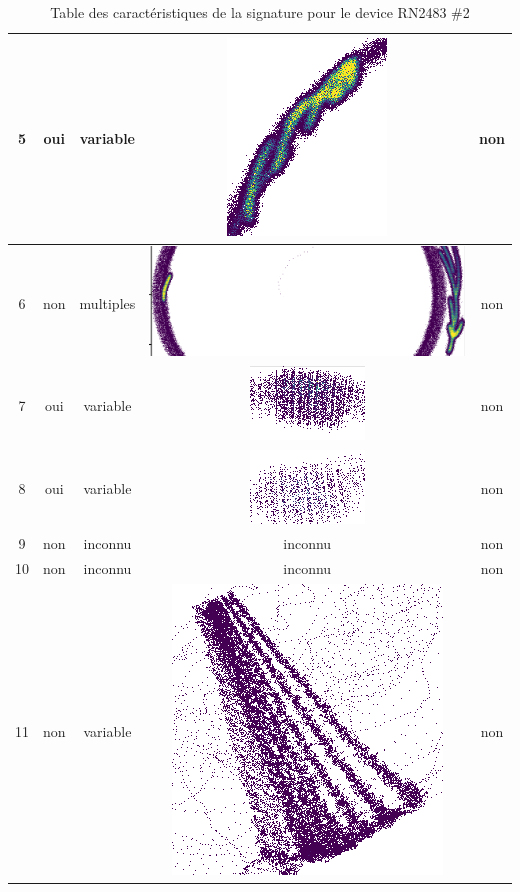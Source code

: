 \begin{table}[h]
\begin{tabular}{|c|c|c|c|c|}
\hline
5 & oui & variable & \includegraphics[scale=0.2]{images/set16.png}  & non \\
\hline
6 & non & multiples & \includegraphics[scale=0.2]{images/set17.png}  & non \\
\hline
7 & oui & variable & \includegraphics[scale=0.2]{images/set18.png}  & non \\
\hline
8 & oui & variable & \includegraphics[scale=0.2]{images/set19.png}  & non \\
\hline
9 & non & inconnu & inconnu & non \\
\hline
10 & non & inconnu & inconnu  & non \\
\hline
11 & non & variable & \includegraphics[scale=0.2]{images/set22.png}  & non \\
\hline
\end{tabular}
\caption{Table des caractéristiques de la signature pour le device RN2483 \#2}
\label{signature2}
\end{table}

